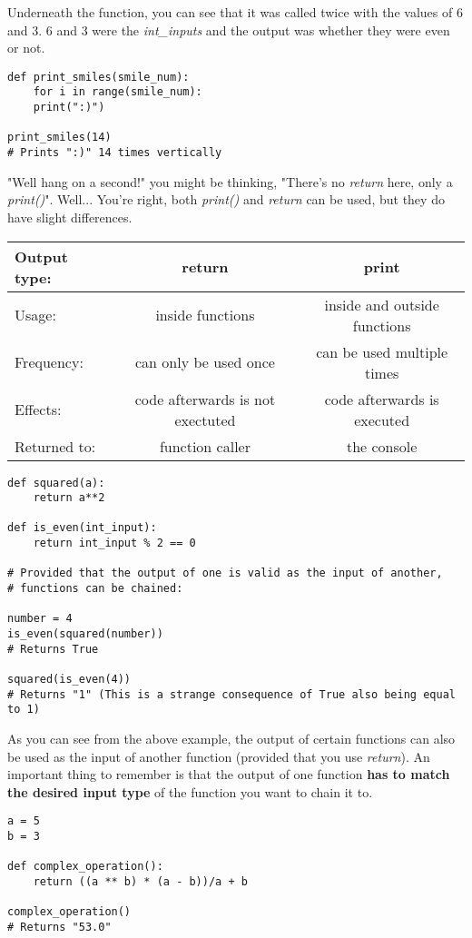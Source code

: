 \documentclass{article}
\begin{document}
Underneath the function, you can see that it was called twice with the values of 6 and 3. 6 and 3 were the \textit{int\_inputs} and the output was whether they were even or not. \medskip

\begin{verbatim}
def print_smiles(smile_num):
    for i in range(smile_num):
	print(":)")

print_smiles(14)
# Prints ":)" 14 times vertically
\end{verbatim}

"Well hang on a second!" you might be thinking, "There's no \textit{return} here, only a \textit{print()}". Well... You're right, both \textit{print()} and \textit{return} can be used, but they do have slight differences.
\begin{center}
\begin{tabular}{l|c|c}
	Output type: & \textbf{return} & \textbf{print} \\
	\hline
	Usage: & inside functions & inside and outside functions \\
	Frequency: & can only be used once & can be used multiple times \\
	Effects: & code afterwards is not exectuted & code afterwards is executed \\
	Returned to: & function caller & the console
\end{tabular}
\end{center}

\begin{verbatim}
def squared(a):
    return a**2

def is_even(int_input):
    return int_input % 2 == 0

# Provided that the output of one is valid as the input of another,
# functions can be chained:

number = 4
is_even(squared(number))
# Returns True

squared(is_even(4))
# Returns "1" (This is a strange consequence of True also being equal to 1)
\end{verbatim}

As you can see from the above example, the output of certain functions can also be used as the input of another function (provided that you use \textit{return}). An important thing to remember is that the output of one function \textbf{has to match the desired input type} of the function you want to chain it to. \medskip

\begin{verbatim}
a = 5
b = 3

def complex_operation():
    return ((a ** b) * (a - b))/a + b

complex_operation()
# Returns "53.0"
\end{verbatim}
\end{document}
